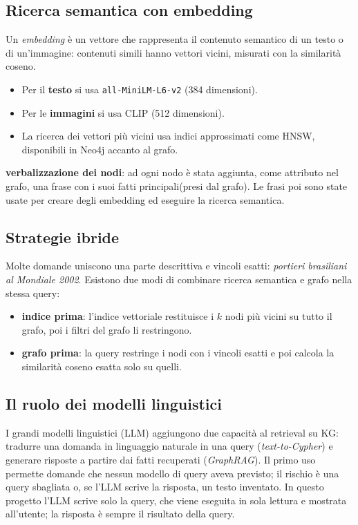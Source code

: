\documentclass[11pt,a4paper]{article}
\newcommand{\code}[1]{\texttt{\small #1}}
\begin{document}
\subsection{Ricerca semantica con embedding}
Un \emph{embedding} è un vettore che rappresenta il contenuto semantico di un testo o di un'immagine: contenuti simili hanno vettori vicini, misurati con la similarità coseno.
\begin{itemize}
  \item Per il \textbf{testo} si usa \code{all-MiniLM-L6-v2} (384 dimensioni).
  \item Per le \textbf{immagini} si usa CLIP (512 dimensioni).
  \item La ricerca dei vettori più vicini usa indici approssimati come HNSW, disponibili in Neo4j accanto al grafo.
\end{itemize}
\textbf{verbalizzazione dei nodi}: ad ogni nodo è stata aggiunta, come attributo nel grafo, una frase con i suoi fatti principali(presi dal grafo). Le frasi poi sono state usate per creare degli embedding ed eseguire la ricerca semantica.

\subsection{Strategie ibride}
Molte domande uniscono una parte descrittiva e vincoli esatti: \emph{portieri brasiliani al Mondiale 2002}. Esistono due modi di combinare ricerca semantica e grafo nella stessa query:
\begin{itemize}
  \item \textbf{indice prima}: l'indice vettoriale restituisce i $k$ nodi più vicini su tutto il grafo, poi i filtri del grafo li restringono.
  \item \textbf{grafo prima}: la query restringe i nodi con i vincoli esatti e poi calcola la similarità coseno esatta solo su quelli.
\end{itemize}

\subsection{Il ruolo dei modelli linguistici}
I grandi modelli linguistici (LLM) aggiungono due capacità al retrieval su KG: tradurre una domanda in linguaggio naturale in una query (\emph{text-to-Cypher}) e generare risposte a partire dai fatti recuperati (\emph{GraphRAG}). Il primo uso permette domande che nessun modello di query aveva previsto; il rischio è una query sbagliata o, se l'LLM scrive la risposta, un testo inventato. In questo progetto l'LLM scrive solo la query, che viene eseguita in sola lettura e mostrata all'utente; la risposta è sempre il risultato della query.
\end{document}

